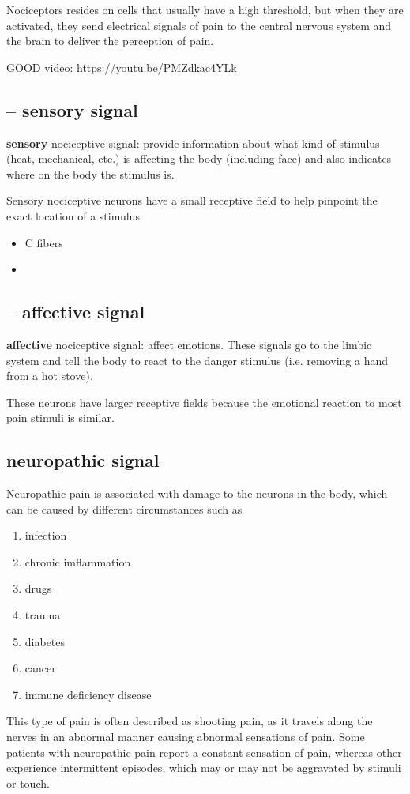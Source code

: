 Nociceptors resides on cells that  usually have a high threshold, but when they
are activated, they send electrical signals of pain to the central nervous
system and the brain to deliver the perception of pain.

GOOD video: \url{https://youtu.be/PMZdkac4YLk}

\subsection{-- sensory signal}
\label{sec:sensory-signal}

{\bf sensory} nociceptive signal: provide information about what kind of
  stimulus (heat, mechanical, etc.) is affecting the body (including face) and
  also indicates where on the body the stimulus is.
  
  Sensory nociceptive neurons have a small receptive field to help pinpoint the
  exact location of a stimulus
  \begin{itemize}
    \item C fibers 
    \item 
  \end{itemize}
  
\subsection{-- affective signal}
\label{sec:affective-signal}

{\bf affective} nociceptive signal: affect emotions. These signals go to
  the limbic system and tell the body to react to the danger stimulus (i.e.
  removing a hand from a hot stove). 
  
  These neurons have larger receptive fields because the emotional reaction to
  most pain stimuli is similar.
  
  

\subsection{neuropathic signal}
\label{sec:neuropathic-signal}


Neuropathic pain is associated with damage to the neurons in the body, which
can be caused by different circumstances such as
\begin{enumerate}
  \item infection
  \item chronic imflammation
  \item drugs
  \item trauma
  \item diabetes
  \item cancer
  \item immune deficiency disease
\end{enumerate}
This type of pain is often described as shooting pain, as it travels along the
nerves in an abnormal manner causing abnormal sensations of pain. Some patients
with neuropathic pain report a constant sensation of pain, whereas other
experience intermittent episodes, which may or may not be aggravated by stimuli
or touch.   


